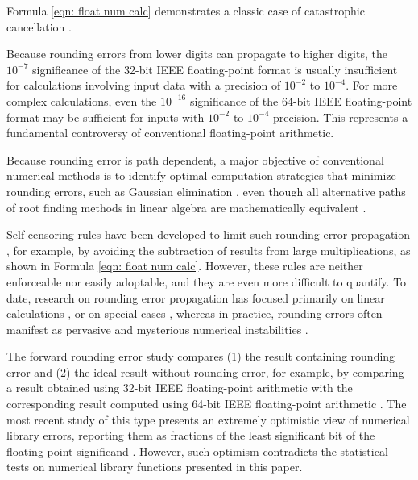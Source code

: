 \documentclass[twoside]{article}
\numberwithin{equation}{section}
\begin{document}
Formula \eqref{eqn: float num calc} demonstrates a classic case of catastrophic cancellation \cite{Rounding_Error}\cite{Algorithms_Accuracy}.

Because rounding errors from lower digits can propagate to higher digits, the $10^{-7}$ significance of the 32-bit IEEE floating-point format \cite{Computer_Architecture}\cite{Floating_Point_Arithmetic}\cite{Floating_Point_Standard} is usually insufficient for calculations involving input data with a precision of $10^{-2}$ to $10^{-4}$.
For more complex calculations, even the $10^{-16}$ significance of the 64-bit IEEE floating-point format \cite{Computer_Architecture}\cite{Floating_Point_Arithmetic}\cite{Floating_Point_Standard} may be sufficient for inputs with $10^{-2}$ to $10^{-4}$ precision.
This represents a fundamental controversy of conventional floating-point arithmetic.

Because rounding error is path dependent, a major objective of conventional numerical methods is to identify optimal computation strategies that minimize rounding errors, such as Gaussian elimination \cite{Algorithms_Accuracy}\cite{Numerical_Recipes}\cite{Precise_Numerical_Methods}, even though all alternative paths of root finding methods in linear algebra are mathematically equivalent \cite{Linear_Algebra}.

Self-censoring rules have been developed to limit such rounding error propagation \cite{Numerical_Recipes}\cite{Precise_Numerical_Methods}, for example, by avoiding the subtraction of results from large multiplications, as shown in Formula \eqref{eqn: float num calc}.  
However, these rules are neither enforceable nor easily adoptable, and they are even more difficult to quantify.
To date, research on rounding error propagation has focused primarily on linear calculations \cite{Rounding_Error}\cite{Algorithms_Accuracy}\cite{prob_interval}, or on special cases \cite{Numerical_Recipes}\cite{Error_Analysi_Digital_Filters}\cite{Floating-point_Digital_Filters}, whereas in practice, rounding errors often manifest as pervasive and mysterious numerical instabilities \cite{Chaotic_Dynamics}.

The forward rounding error study \cite{Algorithms_Accuracy} compares (1) the result containing rounding error and (2) the ideal result without rounding error, for example, by comparing a result obtained using 32-bit IEEE floating-point arithmetic with the corresponding result computed using 64-bit IEEE floating-point arithmetic \cite{rouding_higher_precision}.
The most recent study of this type presents an extremely optimistic view of numerical library errors, reporting them as fractions of the least significant bit of the floating-point significand \cite{rouding_higher_precision}.
However, such optimism contradicts the statistical tests on numerical library functions presented in this paper. 
\end{document}
